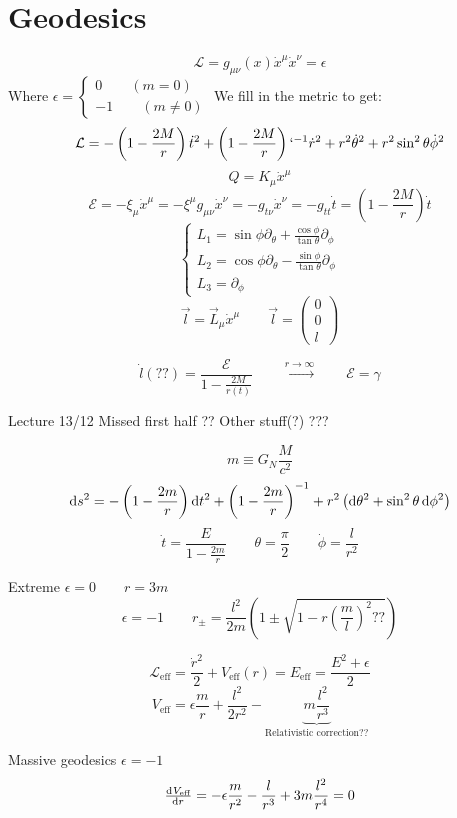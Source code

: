 \section{Geodesics}
\[ \mathcal{L}  = g_{\mu\nu}(x)\dot{x}^\mu \dot{x}^\nu = \epsilon \]
Where $\epsilon = \begin{cases}
0 \qquad (m=0) \\ -1 \qquad (m\neq 0)
\end{cases}$
We fill in the metric to get:
\[ \mathcal{L}  = - \left(1- \frac{2M}{r}\right)\dot{t}^2 + \left(1- \frac{2M}{r}\right)`^{-1}\dot{r}^2 + r^2 \dot{\theta}^2 + r^2\sin^2\theta\dot{\phi}^2 \]
\[Q = K_\mu\dot{x}^\mu\]
\[ \mathcal{E} = -\xi_\mu\dot{x}^\mu = -\xi^\mu g_{\mu\nu}\dot{x}^\nu = - g_{t\nu}\dot{x}^\nu = - g_{tt} \dot{t} = \left(1- \frac{2M}{r}\right)\dot{t} \]
\[ \begin{cases}
L_1 = \sin\phi\partial_\theta + \frac{\cos\phi}{\tan\theta}\partial_\phi \\
L_2 = \cos\phi\partial_\theta - \frac{\sin\phi}{\tan\theta}\partial_\phi \\
L_3 = \partial_\phi
\end{cases} \]
\[ \vec{l} = \vec{L}_\mu\dot{x}^\mu \qquad \vec{l} = \begin{pmatrix}
0\\0\\l
\end{pmatrix}\]

\[ \dot{l}(??) = \frac{\mathcal{E}}{1- \frac{2M}{r(t)}} \qquad \overset{r\to\infty}{\to} \qquad \mathcal{E} = \gamma \]

Lecture 13/12
Missed first half
?? Other stuff(?) ???

\[ m \equiv G_N \frac{M}{c^2} \]
\[ \operatorname{d \!}{s}^2 = - \left(1- \frac{2m}{r}\right)\operatorname{d \!}{t}^2 + \left(1- \frac{2m}{r}\right)^{-1} + r^2 \left(\operatorname{d \!}{\theta}^2 + \sin^2\theta \operatorname{d \!}{\phi}^2\right) \]
\[ \dot{t} = \frac{E}{1- \frac{2m}{r}} \qquad \theta = \frac{\pi}{2} \qquad \dot{\phi} = \frac{l}{r^2} \]

Extreme $\epsilon = 0 \qquad r=3m$
\[ \epsilon=-1 \qquad r_\pm = \frac{l^2}{2m}\left(1\pm\sqrt{1-r(\frac{m}{l})^2??}\right) \]

\[ \mathcal{L} _\text{eff} = \frac{\dot{r}^2}{2} + V_\text{eff}(r) = E_\text{eff} = \frac{E^2+\epsilon}{2} \]
\[ V_\text{eff} = \epsilon \frac{m}{r} + \frac{l^2}{2r^2} - \underbrace{m \frac{l^2}{r^3}}_{\text{Relativistic correction??}} \]

Massive geodesics $\epsilon = -1$
\[\od{V_\text{eff}}{r} = -\epsilon \frac{m}{r^2} - \frac{l}{r^3} + 3m \frac{l^2}{r^4} = 0 \]

